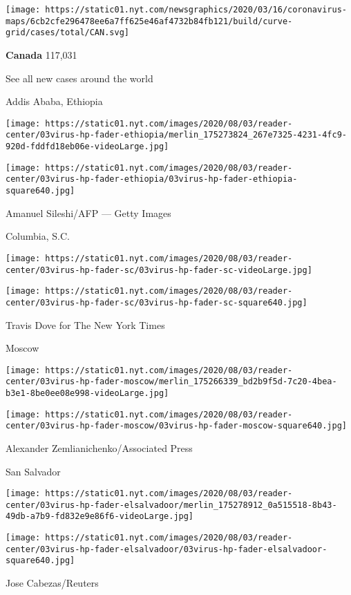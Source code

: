 \texttt{[image: https://static01.nyt.com/newsgraphics/2020/03/16/coronavirus-maps/6cb2cfe296478ee6a7ff625e46af4732b84fb121/build/curve-grid/cases/total/CAN.svg]}

\textbf{Canada} 117,031

\href{https://www.nytimes.com/interactive/2020/world/coronavirus-maps.html}{}

See all new cases around the world

\href{https://www.nytimes.com/2020/08/03/world/coronavirus-covid-19.html}{}

Addis Ababa, Ethiopia

\texttt{[image: https://static01.nyt.com/images/2020/08/03/reader-center/03virus-hp-fader-ethiopia/merlin\_175273824\_267e7325-4231-4fc9-920d-fddfd18eb06e-videoLarge.jpg]}

\texttt{[image: https://static01.nyt.com/images/2020/08/03/reader-center/03virus-hp-fader-ethiopia/03virus-hp-fader-ethiopia-square640.jpg]}

 Amanuel Sileshi/AFP --- Getty Images

Columbia, S.C.

\texttt{[image: https://static01.nyt.com/images/2020/08/03/reader-center/03virus-hp-fader-sc/03virus-hp-fader-sc-videoLarge.jpg]}

\texttt{[image: https://static01.nyt.com/images/2020/08/03/reader-center/03virus-hp-fader-sc/03virus-hp-fader-sc-square640.jpg]}

 Travis Dove for The New York Times

Moscow

\texttt{[image: https://static01.nyt.com/images/2020/08/03/reader-center/03virus-hp-fader-moscow/merlin\_175266339\_bd2b9f5d-7c20-4bea-b3e1-8be0ee08e998-videoLarge.jpg]}

\texttt{[image: https://static01.nyt.com/images/2020/08/03/reader-center/03virus-hp-fader-moscow/03virus-hp-fader-moscow-square640.jpg]}

 Alexander Zemlianichenko/Associated Press

San Salvador

\texttt{[image: https://static01.nyt.com/images/2020/08/03/reader-center/03virus-hp-fader-elsalvadoor/merlin\_175278912\_0a515518-8b43-49db-a7b9-fd832e9e86f6-videoLarge.jpg]}

\texttt{[image: https://static01.nyt.com/images/2020/08/03/reader-center/03virus-hp-fader-elsalvadoor/03virus-hp-fader-elsalvadoor-square640.jpg]}

 Jose Cabezas/Reuters

